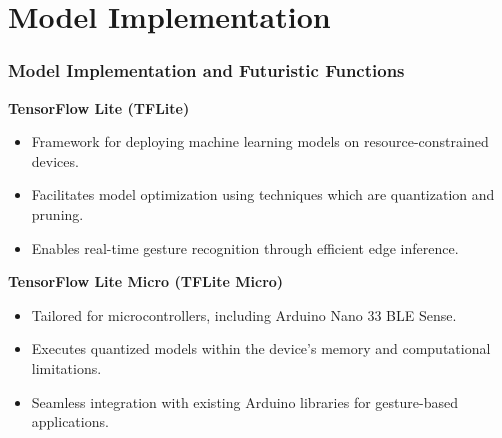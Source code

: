 \section{Model Implementation}
\begin{frame} \frametitle{Model Implementation and Futuristic Functions}
	
	\begin{block}{\textbf{TensorFlow Lite (TFLite)}}
		\begin{itemize}
			\item Framework for deploying machine learning models on resource-constrained devices.
			\item Facilitates model optimization using techniques which are quantization and pruning.
			\item Enables real-time gesture recognition through efficient edge inference.
		\end{itemize}
	\end{block}
	
	\begin{block}{\textbf{TensorFlow Lite Micro (TFLite Micro)}}
		\begin{itemize}
			\item Tailored for microcontrollers, including Arduino Nano 33 BLE Sense.
			\item Executes quantized models within the device's memory and computational limitations.
			\item Seamless integration with existing Arduino libraries for gesture-based applications.
		\end{itemize}
	\end{block}
\end{frame}
